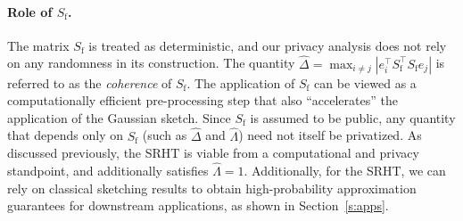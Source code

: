 \documentclass[11pt]{article}
\theoremstyle{definition}
\theoremstyle{plain}
\providecommand{\sectionref}[1]{Section~\ref{#1}}
\newcommand{\abs}[1]{\left| #1 \right|}
\begin{document}
\paragraph{Role of $S_{\mathrm{f}}$.}
The matrix $S_{\mathrm{f}}$ is treated as deterministic, and our privacy analysis does not rely on any randomness in its construction.
The quantity \(\widehat{\Delta} = \max_{i \neq j} |e_{i}^{\top}S_{\mathrm{f}}^{\top}S_{\mathrm{f}}e_{j}|\) is referred to as the \emph{coherence} of \(S_{\mathrm{f}}\).
The application of \(S_{\mathrm{f}}\) can be viewed as a computationally efficient pre-processing step that also ``accelerates'' the application of the Gaussian sketch.
Since $S_{\mathrm{f}}$ is assumed to be public, any quantity that depends only on $S_{\mathrm{f}}$ (such as $\widehat{\Delta}$ and $\widehat{\Lambda}$) need not itself be privatized. 
As discussed previously, the SRHT is viable from a computational and privacy standpoint, and additionally satisfies \(\widehat{\Lambda} = 1\).
Additionally, for the SRHT, we can rely on  
classical sketching results to obtain high-probability approximation guarantees for downstream applications, as shown in \sectionref{s:apps}.
\end{document}
